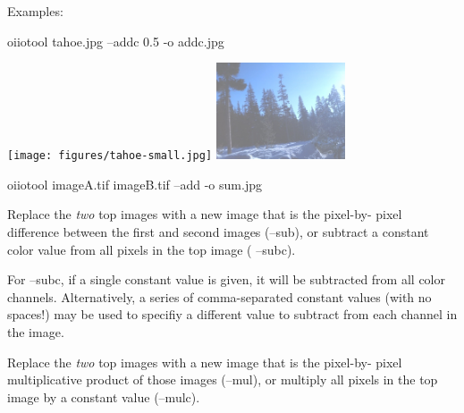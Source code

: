 

\noindent Examples:
\begin{code}
    oiiotool tahoe.jpg --addc 0.5 -o addc.jpg
\end{code}
\spc \texttt{[image: figures/tahoe-small.jpg]}
\raisebox{40pt}{\large $\rightarrow$}
\includegraphics[width=1.5in]{figures/addc.jpg} \\

\vspace{12pt}

\begin{code}
    oiiotool imageA.tif imageB.tif --add -o sum.jpg
\end{code}
\apiend

Replace the \emph{two} top images with a new image that is the pixel-by-
pixel difference between the first and second images ({\cf --sub}), or
subtract a constant color value from all pixels in the top image ({\cf
--subc}).

For {\cf --subc}, if a single constant value is given, it will be subtracted
from all color channels. Alternatively, a series of comma-separated constant
values (with no spaces!) may be used to specifiy a different value to
subtract from each channel in the image.
\apiend

Replace the \emph{two} top images with a new image that is the pixel-by-
pixel multiplicative product of those images ({\cf --mul}), or multiply all
pixels in the top image by a constant value ({\cf --mulc}).

